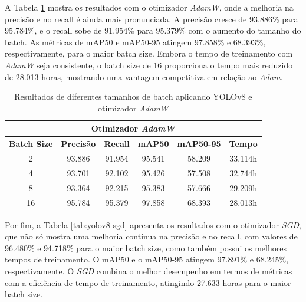 A Tabela \ref{tab:yolov8-admw} mostra os resultados com o otimizador \textit{AdamW}, onde a melhoria na precisão e no recall é ainda mais pronunciada. A precisão cresce de 93.886\% para 95.784\%, e o recall sobe de 91.954\% para 95.379\% com o aumento do tamanho do batch. As métricas de mAP50 e mAP50-95 atingem 97.858\% e 68.393\%, respectivamente, para o maior batch size. Embora o tempo de treinamento com \textit{AdamW} seja consistente, o batch size de 16 proporciona o tempo mais reduzido de 28.013 horas, mostrando uma vantagem competitiva em relação ao \textit{Adam}.

\begin{table}[!hbt]
    \centering
    \begin{tabular}{|c|c|c|c|c|c|}
    \hline
    \multicolumn{6}{|c|}{\textbf{Otimizador \textit{AdamW}}} \\ \hline
    \textbf{Batch Size} & \textbf{Precisão} & \textbf{Recall} & \textbf{mAP50} & \textbf{mAP50-95} & \textbf{Tempo} \\ \hline
    2                   & 93.886            & 91.954          & 95.541         & 58.209            & 33.114h        \\ \hline
    4                   & 93.701            & 92.102          & 95.426         & 57.508            & 32.744h        \\ \hline
    8                   & 93.364            & 92.215          & 95.383         & 57.666            & 29.209h        \\ \hline
    16                  & 95.784            & 95.379          & 97.858         & 68.393            & 28.013h        \\ \hline
    \end{tabular}
    \caption{Resultados de diferentes tamanhos de batch aplicando YOLOv8 e otimizador \textit{AdamW}}
    \label{tab:yolov8-admw}
\end{table}

Por fim, a Tabela \ref{tab:yolov8-sgd} apresenta os resultados com o otimizador \textit{SGD}, que não só mostra uma melhoria contínua na precisão e no recall, com valores de 96.480\% e 94.718\% para o maior batch size, como também possui os melhores tempos de treinamento. O mAP50 e o mAP50-95 atingem 97.891\% e 68.245\%, respectivamente. O \textit{SGD} combina o melhor desempenho em termos de métricas com a eficiência de tempo de treinamento, atingindo 27.633 horas para o maior batch size.

